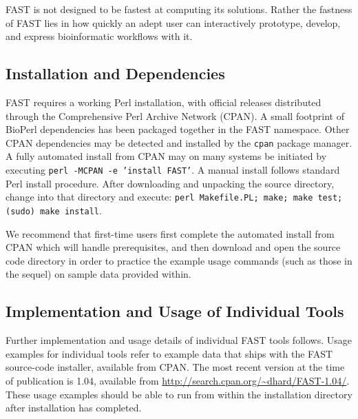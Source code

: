 \documentclass{frontiersSCNS} %
\begin{document}
FAST is not designed to be fastest at computing its
solutions. Rather the fastness of FAST lies in how quickly an adept
user can interactively prototype, develop, and express bioinformatic
workflows with it.

\subsection{Installation and Dependencies}
FAST requires a working Perl installation, with official releases
distributed through the Comprehensive Perl Archive Network (CPAN). A
small footprint of BioPerl dependencies has been packaged together in
the FAST namespace. Other CPAN dependencies may be detected and
installed by the {\tt cpan} package manager. A fully automated install
from CPAN may on many systems be initiated by executing {\tt perl
  -MCPAN -e 'install FAST'}. A manual install follows standard Perl
install procedure. After downloading and unpacking the source
directory, change into that directory and execute: {\tt perl
  Makefile.PL; make; make test; (sudo) make install}.

We recommend that first-time users first complete the automated
install from CPAN which will handle prerequisites, and then download
and open the source code directory in order to practice the example
usage commands (such as those in the sequel) on sample data provided
within.

\subsection{Implementation and Usage of Individual Tools}

Further implementation and usage details of individual FAST tools
follows. Usage examples for individual tools refer to example data
that ships with the FAST source-code installer, available from CPAN.
The most recent version at the time of publication is 1.04, available
from \url{http://search.cpan.org/~dhard/FAST-1.04/}. These usage
examples should be able to run from within the installation directory
after installation has completed.
\end{document}
